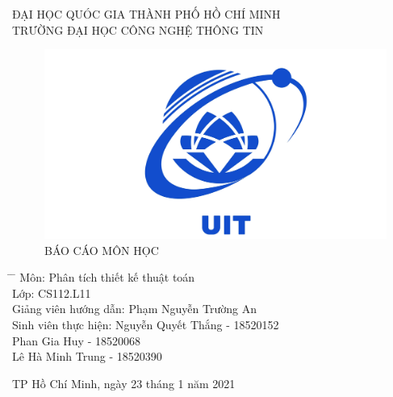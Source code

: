 \documentclass[10pt,a4paper]{article}
\begin{document}
\fontsize{20}{30}\selectfont
{\centering ĐẠI HỌC QUÓC GIA THÀNH PHỐ HỒ CHÍ MINH\\TRƯỜNG ĐẠI HỌC CÔNG NGHỆ THÔNG TIN\par}
\vspace{2 cm}
\begin{center}
    \begin{figure}[htp]
    \begin{center}
     \includegraphics[scale=.3]{logo_uit.jpg} \\
     \fontsize{34}{30}\selectfont
    BÁO CÁO MÔN HỌC \par
    \end{center}
    \end{figure}
    \vspace{1 cm}
    \fontsize{14}{30}\selectfont
    \begin{tabbing}
    \hspace{2 in} \= \hspace{2 in} \= \kill
    Môn: \> Phân tích thiết kế thuật toán \\
    Lớp: \> CS112.L11 \\
    Giảng viên hướng dẫn: \> Phạm Nguyễn Trường An \\
    Sinh viên thực hiện: \> Nguyễn Quyết Thắng - 18520152 \\
    \hspace{5.3 cm}Phan Gia Huy - 18520068 \\
    \hspace{5.3 cm}Lê Hà Minh Trung - 18520390 \\
    \end{tabbing}  

    \begin{center}
    \fontsize{14}{30}\selectfont
     TP Hồ Chí Minh, ngày 23 tháng 1 năm 2021
    \end{center}
\end{center}
\end{document}
